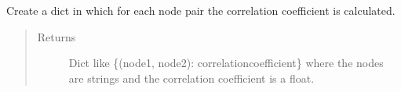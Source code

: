 \documentclass[letterpaper,10pt,english]{sphinxmanual}
\begin{document}

\begin{fulllineitems}
\label{\detokenize{clustering:clustering.overallCorrelationcoefficients}}
\sphinxAtStartPar
Create a dict in which for each node pair the correlation coefficient is calculated.
\begin{quote}\begin{description}
\item[{Returns}] \leavevmode
\sphinxAtStartPar
Dict like \{(node1, node2): correlationcoefficient\} where the nodes are strings and the correlation coefficient is a float.

\end{description}\end{quote}

\end{fulllineitems}

\end{document}
